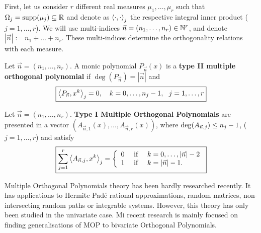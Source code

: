 \documentclass[portrait,final,a0paper,fontscale=0.38]{baposter}
\begin{document}
\begin{poster}
{\begin{multicols}{2}
  First, let us consider $r$ different real measures $\mu_1,\dots,\mu_r$ such that $\Omega_j=\mathrm{supp}(\mu_j)\subseteq\mathbb{R}$ and denote as $\left\langle \cdot , \cdot \right\rangle_j$ the respective integral inner product ($j=1,\dots,r$). We will use multi-indices $\vec n = (n_1, \dots,n_r)\in \mathbb{N}^r$, and denote $|\vec n| := n_1 + \dots + n_r$. These multi-indices determine the orthogonality relations with each measure.
    \begin{definition}
      Let $\vec n = (n_1,\dots,n_r)$. A monic polynomial $P_{\vec n}(x)$ is a \textbf{type II multiple orthogonal polynomial} if $\deg(P_{\vec n})= |\vec n|$ and 
      \begin{equation}
        \label{eq:typeII-MOP-dot}
        \boxed{\left\langle P_{\vec n} , x^k \right\rangle_j = 0, \ \ \ k=0,\dots,n_{j}-1, \ \ j = 1,\dots,r}
    \end{equation}
  \end{definition}

  \begin{definition}
    \label{def:typeI-univar}
    Let $\vec n = (n_1,\dots,n_r)$. \textbf{Type I Multiple Orthogonal Polynomials} are presented in a vector $(A_{\vec n, 1}(x), \dots, A_{\vec n, r}(x))$, where $\deg(A_{\vec n, j})\leq\nolinebreak n_j-1$, ($j=1,\dots,r$) and satisfy
    \begin{equation}
      \label{eq:typeI-MOP-dot}
      \boxed{\sum_{j=1}^r \left\langle A_{\vec n,j} , x^k \right\rangle_j = \left\{\begin{array}{ccl}
          0 &   \text{ if } & k=0,\dots,|\vec n|-2 \\
          1 & \text{ if } & k=|\vec n|-1.      
      \end{array}\right.}
    \end{equation}
  \end{definition}

  Multiple Orthogonal Polynomials theory has been hardly researched recently. It has applications to Hermite-Padé rational approximations, random matrices, non-intersecting random paths or integrable systems. However, this theory has only been studied in the univariate case. Mi recent research is mainly focused on finding generalisations of MOP to bivariate Orthogonal Polynomials.  
  
  \end{multicols}
	}
%
%


\end{poster}
\end{document}
